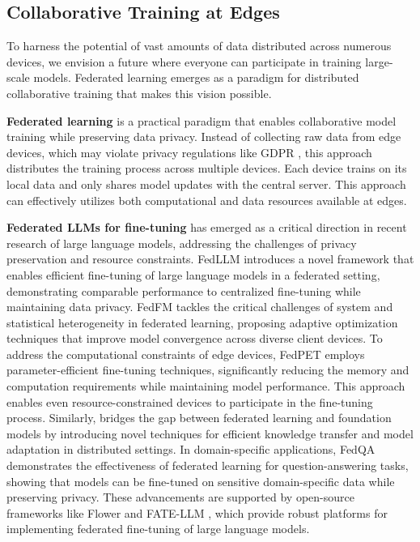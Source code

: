 
\subsection{Collaborative Training at Edges}\label{subsec:collaborative_training}

To harness the potential of vast amounts of data distributed across numerous devices, we envision a future where everyone can participate in training large-scale models. Federated learning emerges as a paradigm for distributed collaborative training that makes this vision possible.

\textbf{Federated learning} \cite{mcmahan2017communication} is a practical paradigm that enables collaborative model training while preserving data privacy. Instead of collecting raw data from edge devices, which may violate privacy regulations like GDPR \cite{gdpr}, this approach distributes the training process across multiple devices. Each device trains on its local data and only shares model updates with the central server. This approach can effectively utilizes both computational and data resources available at edges.


\textbf{Federated LLMs for fine-tuning}
has emerged as a critical direction in recent research of large language models, addressing the challenges of privacy preservation and resource constraints. FedLLM \cite{wu2024fedllm} introduces a novel framework that enables efficient fine-tuning of large language models in a federated setting, demonstrating comparable performance to centralized fine-tuning while maintaining data privacy. FedFM \cite{chen2024fedfm} tackles the critical challenges of system and statistical heterogeneity in federated learning, proposing adaptive optimization techniques that improve model convergence across diverse client devices.
To address the computational constraints of edge devices, FedPET \cite{li2024fedpet} employs parameter-efficient fine-tuning techniques, significantly reducing the memory and computation requirements while maintaining model performance. This approach enables even resource-constrained devices to participate in the fine-tuning process. Similarly, \cite{xu2024fedfm} bridges the gap between federated learning and foundation models by introducing novel techniques for efficient knowledge transfer and model adaptation in distributed settings.
In domain-specific applications, FedQA \cite{wang2024fedqa} demonstrates the effectiveness of federated learning for question-answering tasks, showing that models can be fine-tuned on sensitive domain-specific data while preserving privacy. These advancements are supported by open-source frameworks like Flower \cite{Flower} and FATE-LLM \cite{fan2023fate}, which provide robust platforms for implementing federated fine-tuning of large language models. 



